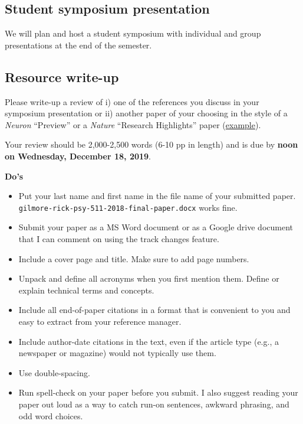 \documentclass[]{article}
\providecommand{\tightlist}{%
  \setlength{\itemsep}{0pt}\setlength{\parskip}{0pt}}
\begin{document}
\hypertarget{student-symposium-presentation}{%
\subsection{Student symposium
presentation}\label{student-symposium-presentation}}

We will plan and host a student symposium with individual and group
presentations at the end of the semester.

\hypertarget{resource-write-up}{%
\subsection{Resource write-up}\label{resource-write-up}}

Please write-up a review of i) one of the references you discuss in your
symposium presentation or ii) another paper of your choosing in the
style of a \emph{Neuron} ``Preview'' or a \emph{Nature} ``Research
Highlights'' paper
(\href{https://www.nature.com/search?article_type=research-highlights\&order=date_desc}{example}).

Your review should be 2,000-2,500 words (6-10 pp in length) and is due
by \textbf{noon on Wednesday, December 18, 2019}.

\textbf{Do's}

\begin{itemize}
\tightlist
\item
  Put your last name and first name in the file name of your submitted
  paper. \texttt{gilmore-rick-psy-511-2018-final-paper.docx} works fine.
\item
  Submit your paper as a MS Word document or as a Google drive document
  that I can comment on using the track changes feature.
\item
  Include a cover page and title. Make sure to add page numbers.
\item
  Unpack and define all acronyms when you first mention them. Define or
  explain technical terms and concepts.
\item
  Include all end-of-paper citations in a format that is convenient to
  you and easy to extract from your reference manager.
\item
  Include author-date citations in the text, even if the article type
  (e.g., a newspaper or magazine) would not typically use them.
\item
  Use double-spacing.
\item
  Run spell-check on your paper before you submit. I also suggest
  reading your paper out loud as a way to catch run-on sentences,
  awkward phrasing, and odd word choices.
\end{itemize}
\end{document}
